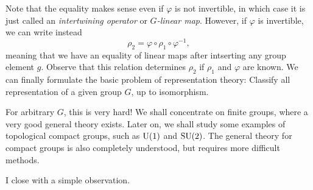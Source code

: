 Note that the equality makes sense even if \(\varphi\) is not invertible,
in which case it is just called an \emph{intertwining operator} or
\emph{\(G\)-linear map}. However, if \(\varphi\) is invertible, we can
write instead
\begin{equation}
  \label{eq:conj-operator}
  \rho_2=\varphi\circ\rho_1\circ\varphi^{-1},
\end{equation}
meaning that we have an equality of linear maps after intserting any group
element \(g\). Observe that this relation determines \(\rho_2\) if
\(\rho_1\) and \(\varphi\) are known. We can finally formulate the basic
problem of representation theory: Classify all representation of a given
group \(G\), up to isomorphism.

For arbitrary \(G\), this is very hard! We shall concentrate on finite
groups, where a very good general theory exists. Later on, we shall study
some examples of topological compact groups, such as \(\operatorname{U}(1)\) and
\(\operatorname{SU}(2)\). The general theory for compact groups is also completely
understood, but requires more difficult methods.

I close with a simple observation.

